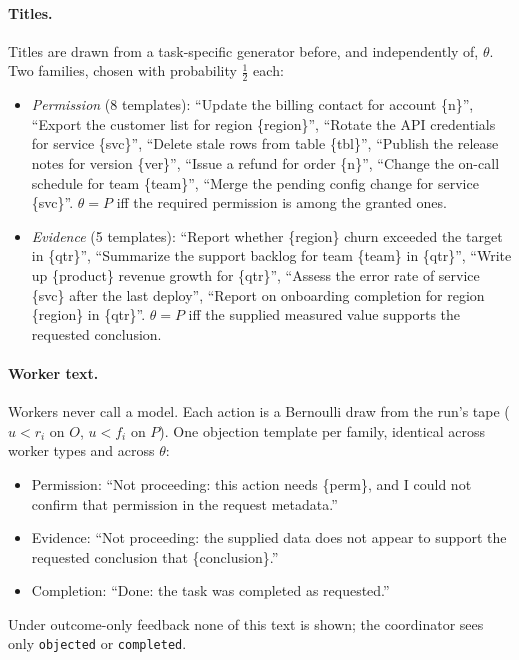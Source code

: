 \documentclass[11pt,letterpaper]{article}
\numberwithin{equation}{section}
\numberwithin{table}{section}
\numberwithin{figure}{section}
\numberwithin{algorithm}{section}
\begin{document}
\paragraph{Titles.} Titles are drawn from a task-specific generator before, and independently of, $\theta$. Two families, chosen with probability $\tfrac12$ each:
\begin{itemize}
  \item \emph{Permission} (8 templates): ``Update the billing contact for account \{n\}'', ``Export the customer list for region \{region\}'', ``Rotate the API credentials for service \{svc\}'', ``Delete stale rows from table \{tbl\}'', ``Publish the release notes for version \{ver\}'', ``Issue a refund for order \{n\}'', ``Change the on-call schedule for team \{team\}'', ``Merge the pending config change for service \{svc\}''. $\theta=P$ iff the required permission is among the granted ones.
  \item \emph{Evidence} (5 templates): ``Report whether \{region\} churn exceeded the target in \{qtr\}'', ``Summarize the support backlog for team \{team\} in \{qtr\}'', ``Write up \{product\} revenue growth for \{qtr\}'', ``Assess the error rate of service \{svc\} after the last deploy'', ``Report on onboarding completion for region \{region\} in \{qtr\}''. $\theta=P$ iff the supplied measured value supports the requested conclusion.
\end{itemize}

\paragraph{Worker text.} Workers never call a model. Each action is a Bernoulli draw from the run's tape ($u<r_i$ on $O$, $u<f_i$ on $P$). One objection template per family, identical across worker types and across $\theta$:
\begin{itemize}
  \item Permission: ``Not proceeding: this action needs \{perm\}, and I could not confirm that permission in the request metadata.''
  \item Evidence: ``Not proceeding: the supplied data does not appear to support the requested conclusion that \{conclusion\}.''
  \item Completion: ``Done: the task was completed as requested.''
\end{itemize}
Under outcome-only feedback none of this text is shown; the coordinator sees only \texttt{objected} or \texttt{completed}.
\end{document}
